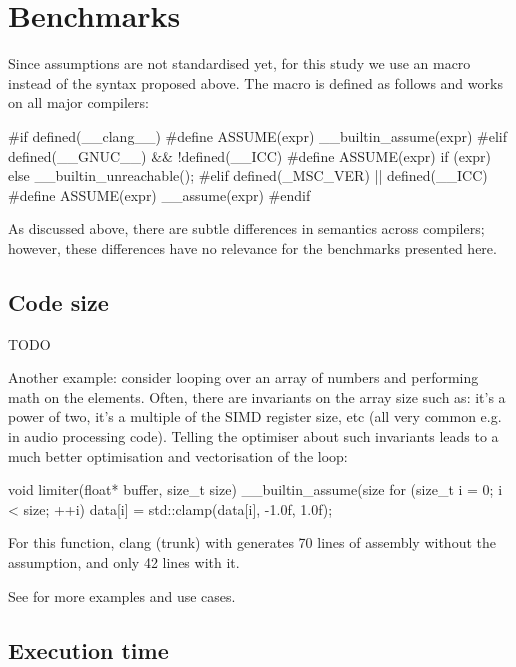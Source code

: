 
\section{Benchmarks}

Since assumptions are not standardised yet, for this study we use an  macro instead of the syntax proposed above. The macro is defined as follows and works on all major compilers:

\begin{codeblock}
#if defined(__clang__)
  #define ASSUME(expr) __builtin_assume(expr)
#elif defined(__GNUC__) && !defined(__ICC)
  #define ASSUME(expr) if (expr) {} else { __builtin_unreachable(); }
#elif defined(_MSC_VER) || defined(__ICC)
  #define ASSUME(expr) __assume(expr)
#endif
\end{codeblock}

As discussed above, there are subtle differences in semantics across compilers; however, these differences have no relevance for the benchmarks presented here.

\subsection{Code size}

TODO

Another example: consider looping over an array of numbers and performing math on the elements. Often, there are invariants on the array size such as: it's a power of two, it's a multiple of the SIMD register size, etc (all very common e.g. in audio processing code). Telling the optimiser about such invariants leads to a much better optimisation and vectorisation of the loop:

\begin{codeblock}
void limiter(float* buffer, size_t size) 
{
  __builtin_assume(size %
  for (size_t i = 0; i < size; ++i)
     data[i] = std::clamp(data[i], -1.0f, 1.0f);
}
\end{codeblock}

For this function, clang (trunk) with  generates 70 lines of assembly without the assumption, and only 42 lines with it.

See \cite{Regehr2014} for more examples and use cases. 

\subsection{Execution time}

